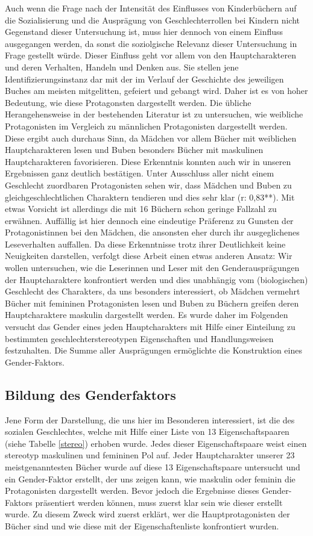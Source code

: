 Auch wenn die Frage nach der Intensität des Einflusses von Kinderbüchern
auf die Sozialisierung und die Ausprägung von Geschlechterrollen bei
Kindern nicht Gegenstand dieser Untersuchung ist, muss hier dennoch von
einem Einfluss ausgegangen werden, da sonst die soziolgische Relevanz
dieser Untersuchung in Frage gestellt würde. Dieser Einfluss geht vor
allem von den Hauptcharakteren und deren Verhalten, Handeln und Denken
aus. Sie stellen jene Identifizierungsinstanz dar mit der im Verlauf der
Geschichte des jeweiligen Buches am meisten mitgelitten, gefeiert und
gebangt wird. Daher ist es von hoher Bedeutung, wie diese Protagonsten
dargestellt werden. Die übliche Herangehensweise in der bestehenden
Literatur ist zu untersuchen, wie weibliche Protagonisten im Vergleich
zu männlichen Protagonisten dargestellt werden. Diese ergibt auch
durchaus Sinn, da Mädchen vor allem Bücher mit weiblichen
Hauptcharakteren lesen und Buben besonders Bücher mit maskulinen
Hauptcharakteren favorisieren. Diese Erkenntnis konnten auch wir in
unseren Ergebnissen ganz deutlich bestätigen. Unter Ausschluss aller
nicht einem Geschlecht zuordbaren Protagonisten sehen wir, dass Mädchen
und Buben zu gleichgeschlechtlichen Charaktern tendieren und dies sehr
klar (r: 0,83**). Mit etwas Vorsicht ist allerdings die mit 16 Büchern
schon geringe Fallzahl zu erwähnen. Auffällig ist hier dennoch eine
eindeutige Präferenz zu Gunsten der Protagonistinnen bei den Mädchen,
die ansonsten eher durch ihr ausgeglichenes Leseverhalten auffallen. Da
diese Erkenntnisse trotz ihrer Deutlichkeit keine Neuigkeiten
darstellen, verfolgt diese Arbeit einen etwas anderen Ansatz: Wir wollen
untersuchen, wie die Leserinnen und Leser mit den Genderausprägungen der
Hauptcharaktere konfrontiert werden und dies unabhängig vom
(biologischen) Geschlecht des Charakters, da uns besonders interessiert,
ob Mädchen vermehrt Bücher mit femininen Protagonisten lesen und Buben
zu Büchern greifen deren Hauptcharaktere maskulin dargestellt werden. Es
wurde daher im Folgenden versucht das Gender eines jeden Hauptcharakters
mit Hilfe einer Einteilung zu bestimmten geschlechterstereotypen
Eigenschaften und Handlungsweisen festzuhalten. Die Summe aller
Ausprägungen ermöglichte die Konstruktion eines Gender-Faktors.

\subsection{Bildung des Genderfaktors}

Jene Form der Darstellung, die uns hier im Besonderen interessiert, ist
die des sozialen Geschlechtes, welche mit Hilfe einer Liste von 13
Eigenschaftspaaren (siehe Tabelle \ref{stereo}) erhoben wurde. Jedes
dieser Eigenschaftspaare weist einen stereotyp maskulinen und femininen
Pol auf. Jeder Hauptcharakter unserer 23 meistgenanntesten Bücher wurde
auf diese 13 Eigenschaftspaare untersucht und ein Gender-Faktor
erstellt, der uns zeigen kann, wie maskulin oder feminin die
Protagonisten dargestellt werden. Bevor jedoch die Ergebnisse dieses
Gender-Faktors präsentiert werden können, muss zuerst klar sein wie
dieser erstellt wurde. Zu diesem Zweck wird zuerst erklärt, wer die
Hauptprotagonisten der Bücher sind und wie diese mit der
Eigenschaftenliste konfrontiert wurden.

